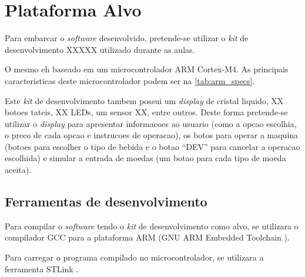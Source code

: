 %
%
%
%
%

%
%
%
%
%

\section{Plataforma Alvo} \label{sec:platform}

Para embarcar o \textit{software} desenvolvido, pretende-se utilizar o \textit{kit} de desenvolvimento XXXXX utilizado durante as aulas.

O mesmo eh baseado em um microcontrolador ARM Cortex-M4. As principais caracteristicas deste microcontrolador podem ser na \autoref{tab:arm_specs}.

Este \textit{kit} de desenvolvimento tambem possui um \textit{display} de cristal liquido, XX botoes tateis, XX LEDs, um sensor XX, entre outros. Deste forma pretende-se utilizar o \textit{display} para apresentar informacoes ao usuario (como a opcao escolhia, o preco de cada opcao e instrucoes de operacao), os botos para operar a maquina (botoes para escolher o tipo de bebida e o botao ``DEV'' para cancelar a operacao escolhida) e simular a entrada de moedas (um botao para cada tipo de moeda aceita).

\subsection{Ferramentas de desenvolvimento}

Para compilar o \textit{software} tendo o \textit{kit} de desenvolvimento como alvo, se utilizara o compilador GCC para a plataforma ARM (GNU ARM Embedded Toolchain \cite{gcc_arm}).

Para carregar o programa compilado no microcontrolador, se utilizara a ferramenta STLink \cite{stlink}.
